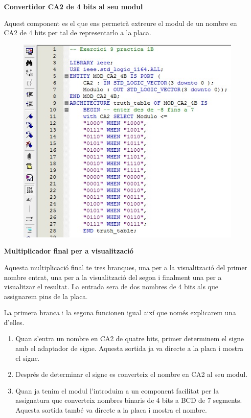 \documentclass[12pt, a4papre]{article}
\begin{document}
\begin{center}
\begin{center}
	\end{center}
	
	\textbf{\large{Convertidor CA2 de 4 bits al seu modul}}
	
	Aquest component es el que ens permetrà extreure el modul de un nombre en CA2 de 4 bits per tal de representarlo a la placa.
	
	\begin{center}
	\begin{figure}[H]
		\begin{center}
		\includegraphics[width=150mm]{ConvCA2_4aMOD.jpeg}
		\end{center}
	\end{figure}
	
	\end{center}
	
	\textbf{\large{Multiplicador final per a visualització}}
	
	Aquesta multiplicació final te tres branques, una per a la visualització del primer nombre entrat, una per a la visualització del segon i finalment una per a visualitzar el resultat. La entrada sera de dos nombres de 4 bits als que assignarem pins de la placa. 
	
	La primera branca i la segona funcionen igual així que només explicarem una d'elles. 
	\begin{enumerate}
	\item Quan s'entra un nombre en CA2 de quatre bits, primer determinem el signe amb el adaptador de signe. Aquesta sortida ja va directe a la placa i mostra el signe.
	\item Després de determinar el signe es converteix el nombre en CA2 al seu modul.
	\item Quan ja tenim el modul l'introduim a un component facilitat per la assignatura que converteix nombres binaris de 4 bits a BCD de 7 segments. Aquesta sortida també va directe a la placa i mostra el nombre.
	\end{enumerate}
	

\end{center}
\end{document}
